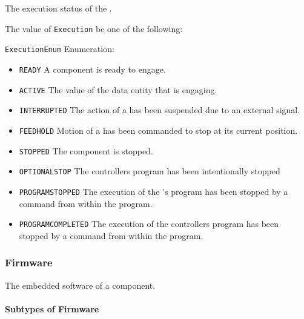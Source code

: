 The execution status of the .


The value of \texttt{Execution} \MUST be one of the following: 


\texttt{ExecutionEnum} Enumeration:

\begin{itemize}
\item \texttt{READY} \newline A component is ready to engage. 
\item \texttt{ACTIVE} \newline The value of the \gls{data entity} that is engaging. 
\item \texttt{INTERRUPTED} \newline The action of a  has been suspended due to an external signal. 
\item \texttt{FEED\textunderscore HOLD} \newline Motion of a  has been commanded to stop at its current position. 
\item \texttt{STOPPED} \newline The component is stopped. 
\item \texttt{OPTIONAL\textunderscore STOP} \newline The controllers program has been intentionally stopped 
\item \texttt{PROGRAM\textunderscore STOPPED} \newline The execution of the 's program has been stopped by a command from within the program. 
\item \texttt{PROGRAM\textunderscore COMPLETED} \newline The execution of the controllers program has been stopped by a command from within the program. 
\end{itemize}



\subsubsection{Firmware}
\label{sec:Firmware}



The embedded software of a component.


\paragraph{Subtypes of Firmware}\mbox{}
\label{sec:Subtypes of Firmware}

